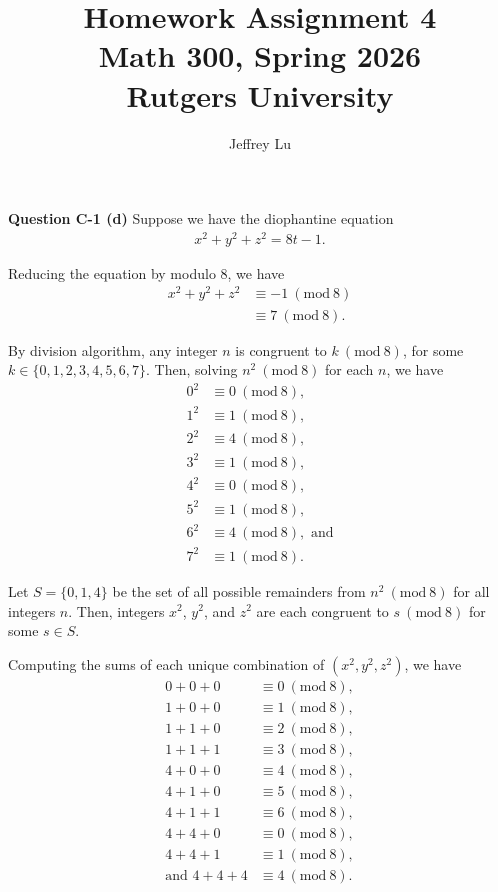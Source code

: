 \documentclass[12pt]{article}
\title{Homework Assignment 4 \\ \large Math 300, Spring 2026 \\ Rutgers University}
\author{Jeffrey Lu}
\newcommand{\Mod}[1]{\ (\mathrm{mod}\ #1)}
\begin{document}
\maketitle

\noindent \textbf{Question C-1 (d)}
Suppose we have the diophantine equation
\begin{align*}
    x^2+y^2+z^2 = 8t -1.
\end{align*}

Reducing the equation by modulo 8, we have
\begin{align*}
    x^2 + y^2 + z^2 & \equiv -1 \Mod{8} \\
                    & \equiv 7 \Mod{8}.
\end{align*}

By division algorithm, any integer $n$ is congruent to $k \Mod{8}$, for some $k \in{\{0,1,2,3,4,5,6,7\}}$.
Then, solving $n^2 \Mod{8}$ for each $n$, we have
\begin{align*}
    0^2 & \equiv{} 0 \Mod{8},             \\
    1^2 & \equiv{} 1 \Mod{8},             \\
    2^2 & \equiv{} 4 \Mod{8},             \\
    3^2 & \equiv{} 1 \Mod{8},             \\
    4^2 & \equiv{} 0 \Mod{8},             \\
    5^2 & \equiv{} 1 \Mod{8},             \\
    6^2 & \equiv{} 4 \Mod{8}, \text{ and} \\
    7^2 & \equiv{} 1 \Mod{8}.
\end{align*}

Let $S = \{0,1,4\}$ be the set of all possible remainders from $n^2 \Mod{8}$ for all integers $n$.
Then, integers $x^2$, $y^2$, and $z^2$ are each congruent to $s \Mod{8}$ for some $s\in{S}$.

Computing the sums of each unique combination of $(x^2, y^2, z^2)$, we have
\begin{align*}
    0 + 0 + 0             & \equiv{} 0 \Mod{8}, \\
    1 + 0 + 0             & \equiv{} 1 \Mod{8}, \\
    1 + 1 + 0             & \equiv{} 2 \Mod{8}, \\
    1 + 1 + 1             & \equiv{} 3 \Mod{8}, \\
    4 + 0 + 0             & \equiv{} 4 \Mod{8}, \\
    4 + 1 + 0             & \equiv{} 5 \Mod{8}, \\
    4 + 1 + 1             & \equiv{} 6 \Mod{8}, \\
    4 + 4 + 0             & \equiv{} 0 \Mod{8}, \\
    4 + 4 + 1             & \equiv{} 1 \Mod{8}, \\
    \text{and } 4 + 4 + 4 & \equiv{} 4 \Mod{8}.
\end{align*}
\end{document}
